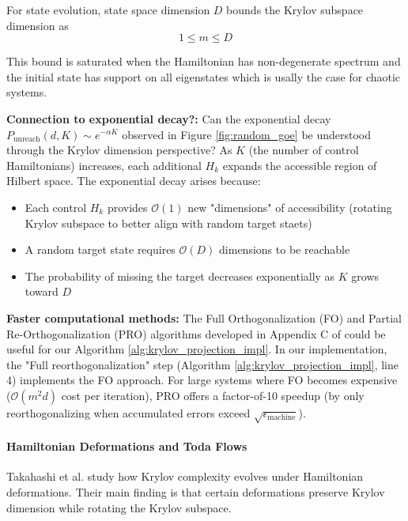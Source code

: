\documentclass[ a4paper, 
                amsfonts, 
                amssymb, 
                amsmath, 
                reprint, 
                showkeys, 
                nofootinbib,
                superscriptaddress, 
                onecolumn, 
                notitlepage,
                aps,
                pra,
                longbibliography]{revtex4-1}
\theoremstyle{definition}
\begin{document}
For state evolution, state space dimension $D$ bounds the Krylov subspace dimension as
\begin{equation}
1 \leq m \leq D
\end{equation}

This bound is saturated when the Hamiltonian has non-degenerate spectrum and the initial state has support on all eigenstates which is usally the case for chaotic systems.

\textbf{Connection to exponential decay?:} Can the exponential decay $P_{\text{unreach}}(d,K) \sim e^{-\alpha K}$ observed in Figure \ref{fig:random_goe}  be understood through the Krylov dimension perspective? As $K$ (the number of control Hamiltonians) increases, each additional $H_k$ expands the accessible region of Hilbert space. The exponential decay arises because:
\begin{itemize}
\item Each control $H_k$ provides $\mathcal{O}(1)$ new "dimensions" of accessibility (rotating Krylov subspace to better align with random target staets)
\item A random target state requires $\mathcal{O}(D)$ dimensions to be reachable
\item The probability of missing the target decreases exponentially as $K$ grows toward $D$
\end{itemize}

\textbf{Faster computational methods:} The Full Orthogonalization (FO) and Partial Re-Orthogonalization (PRO) algorithms developed in Appendix C of \cite{takahashi2025krylovcomplexityhamiltoniandeformations} could be useful for our Algorithm \ref{alg:krylov_projection_impl}. In our implementation, the "Full reorthogonalization" step (Algorithm \ref{alg:krylov_projection_impl}, line 4) implements the FO approach. For large systems where FO becomes expensive ($\mathcal{O}(m^2 d)$ cost per iteration), PRO offers a factor-of-10 speedup (by only reorthogonalizing when accumulated errors exceed $\sqrt{\epsilon_{\text{machine}}}$).

\paragraph{Hamiltonian Deformations and Toda Flows}

Takahashi et al. \cite{takahashi2025krylovcomplexityhamiltoniandeformations} study how Krylov complexity evolves under Hamiltonian deformations. Their main finding is that certain deformations preserve Krylov dimension while rotating the Krylov subspace.
\end{document}
